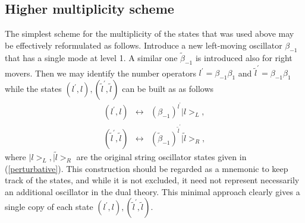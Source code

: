 \subsection{Higher multiplicity scheme}

The simplest scheme for the multiplicity of the states that was used above
may be effectively reformulated as follows. Introduce a new left-moving
oscillator $\beta _{-1}$ that has a single mode at level 1. A similar one $%
\tilde \beta _{-1}$ is introduced also for right movers. Then we may
identify the number operators $l^{\prime }=\beta _{-1}\beta _1$ and $\tilde l%
^{\prime }=\beta _{-1}\beta _1$ while the states $\left( l^{\prime
},l\right) ,(\tilde l^{\prime },\tilde l)$ can be built as as follows
\begin{eqnarray}
\left( l^{\prime },l\right) &\longleftrightarrow &\left( \beta _{-1}\right)
^{l^{\prime }}|l>_L, \\
(\tilde l^{\prime },\tilde l) &\longleftrightarrow &\left( \tilde \beta
_{-1}\right) ^{\tilde l^{\prime }}|\tilde l>_R,  \nonumber
\end{eqnarray}
where $|l>_L,|\tilde l>_R$ are the original string oscillator states given
in (\ref{perturbative}). This construction should be regarded as a mnemonic
to keep track of the states, and while it is not excluded, it need not
represent necessarily an additional oscillator in the dual theory. This
minimal approach clearly gives a single copy of each state $\left( l^{\prime
},l\right) ,(\tilde l^{\prime },\tilde l).$

